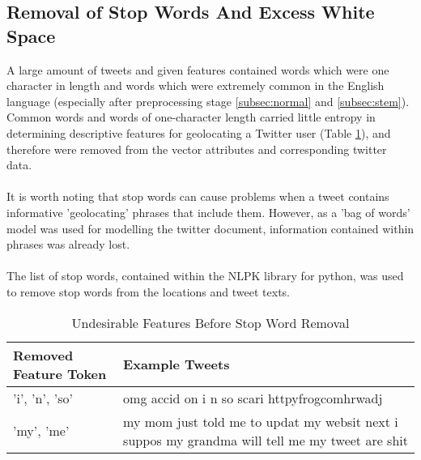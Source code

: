 \documentclass[11pt]{article}
\begin{document}
\subsection{Removal of Stop Words And Excess White Space}
A large amount of tweets and given features contained words which were one character in length and words which were extremely common in the English language (especially after preprocessing stage \ref{subsec:normal} and \ref{subsec:stem}). Common words and words of one-character length carried little entropy\citep{ra-stop} in determining descriptive features for geolocating a Twitter user (Table \ref{table:stop-words}), and therefore were removed from the vector attributes and corresponding twitter data.\\\\
It is worth noting that stop words can cause problems when a tweet contains informative 'geolocating' phrases that include them. However, as a 'bag of words' model was used for modelling the twitter document, information contained within phrases was already lost. \\\\
The list of stop words, contained within the NLPK library for python, was used to remove stop words from the locations and tweet texts.

\begin{table}[h]
	\centering
	\caption{Undesirable Features Before Stop Word Removal}
	\begin{tabular}{| l | p{12cm} |}
	\hline
	 \textbf{Removed Feature Token} & \textbf{Example Tweets}\\
	\hline
	'i', 'n', 'so' & omg accid on i n so scari httpyfrogcomhrwadj \\
	\hline
	'my', 'me'  & my mom just told me to updat my websit next i suppos my grandma will tell me my tweet are shit\\
	\hline
	\end{tabular}
	\label{table:stop-words}
\end{table}
\end{document}
